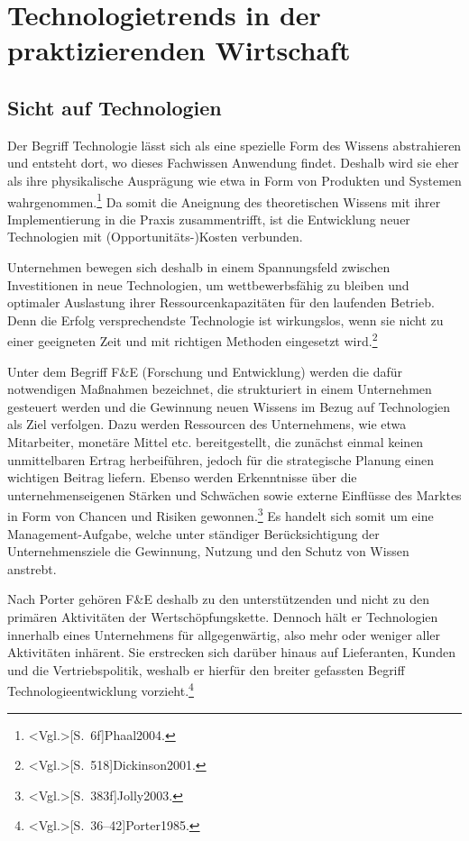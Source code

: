 \section{Technologietrends in der praktizierenden Wirtschaft}

\subsection{Sicht auf Technologien}
Der Begriff Technologie lässt sich als eine spezielle Form des Wissens abstrahieren und entsteht dort, wo dieses Fachwissen Anwendung findet. Deshalb wird sie eher als ihre physikalische Ausprägung wie etwa in Form von Produkten und Systemen wahrgenommen.\footnote{\citeNP<Vgl.>[S.~6f]{Phaal2004}.} Da somit die Aneignung des theoretischen Wissens mit ihrer Implementierung in die Praxis zusammentrifft, ist die Entwicklung neuer Technologien mit (Opportunitäts-)Kosten verbunden.

Unternehmen bewegen sich deshalb in einem Spannungsfeld zwischen Investitionen in neue Technologien, um wettbewerbsfähig zu bleiben und optimaler Auslastung ihrer Ressourcenkapazitäten für den laufenden Betrieb. Denn die Erfolg versprechendste Technologie ist wirkungslos, wenn sie nicht zu einer geeigneten Zeit und mit richtigen Methoden eingesetzt wird.\footnote{\citeNP<Vgl.>[S.~518]{Dickinson2001}.}

Unter dem Begriff F\&E (Forschung und Entwicklung) werden die dafür notwendigen Maßnahmen bezeichnet, die strukturiert in einem Unternehmen gesteuert werden und die Gewinnung neuen Wissens im Bezug auf Technologien als Ziel verfolgen. Dazu werden Ressourcen des Unternehmens, wie etwa Mitarbeiter, monetäre Mittel etc. bereitgestellt, die zunächst einmal keinen unmittelbaren Ertrag herbeiführen, jedoch für die strategische Planung einen wichtigen Beitrag liefern. Ebenso werden Erkenntnisse über die unternehmenseigenen Stärken und Schwächen sowie externe Einflüsse des Marktes in Form von Chancen und Risiken gewonnen.\footnote{\citeNP<Vgl.>[S.~383f]{Jolly2003}.} Es handelt sich somit um eine Management-Aufgabe, welche unter ständiger Berücksichtigung der Unternehmensziele die Gewinnung, Nutzung und den Schutz von Wissen anstrebt.

Nach Porter gehören F\&E deshalb zu den unterstützenden und nicht zu den primären Aktivitäten der Wertschöpfungskette. Dennoch hält er Technologien innerhalb eines Unternehmens für allgegenwärtig, also mehr oder weniger aller Aktivitäten inhärent. Sie erstrecken sich darüber hinaus auf Lieferanten, Kunden und die Vertriebspolitik, weshalb er hierfür den breiter gefassten Begriff Technologieentwicklung vorzieht.\footnote{\citeNP<Vgl.>[S.~36--42]{Porter1985}.}

